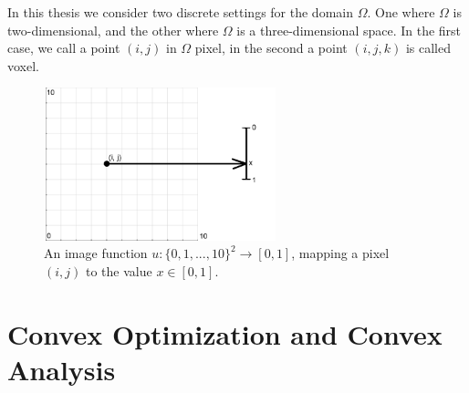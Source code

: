 \documentclass[abstracton]{scrreprt}
\begin{document}
        In this thesis we consider two discrete settings for the domain $\Omega$. One where $\Omega$ is two-dimensional, and the other where $\Omega$ is a three-dimensional space. In the first case, we call a point $(i, j)$ in $\Omega$ pixel, in the second a point $(i, j, k)$ is called voxel.
        \begin{figure}[!ht]
            \centering
                \includegraphics[width=0.6\textwidth]{img/image_mapping.png}
            \caption[Mapping of images.]{An image function $u: \{0,1,...,10\}^{2} \to [0,1]$, mapping a pixel $(i,j)$ to the value $x \in [0,1]$.}
        \label{fig:image_mapping}
        \end{figure}
    \section{Convex Optimization and Convex Analysis} %
    \label{sec:convex_optimization_and_convex_analysis}
\end{document}
